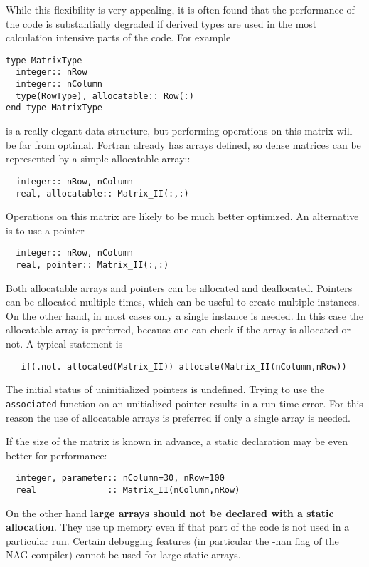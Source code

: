 \documentclass{article}
\begin{document}
While this flexibility is very appealing, it is often found that 
the performance of the code is substantially degraded if derived types
are used in the most calculation intensive parts of the code.
For example
\begin{verbatim}
type MatrixType
  integer:: nRow
  integer:: nColumn
  type(RowType), allocatable:: Row(:)
end type MatrixType
\end{verbatim}
is a really elegant data structure, but performing operations on this
matrix will be far from optimal. Fortran already has arrays defined,
so dense matrices can be represented by a simple allocatable array::
\begin{verbatim}
  integer:: nRow, nColumn
  real, allocatable:: Matrix_II(:,:)
\end{verbatim}
Operations on this matrix are likely to be much better optimized. 
An alternative is to use a pointer
\begin{verbatim}
  integer:: nRow, nColumn
  real, pointer:: Matrix_II(:,:)
\end{verbatim}
Both allocatable arrays and pointers can be allocated and deallocated.
Pointers can be allocated multiple times, which can be useful to create
multiple instances. On the other hand, in most cases only a single
instance is needed. In this case the allocatable array is preferred,
because one can check if the array is allocated or not. A typical
statement is
\begin{verbatim}
   if(.not. allocated(Matrix_II)) allocate(Matrix_II(nColumn,nRow))
\end{verbatim}
The initial status of uninitialized pointers is undefined.
Trying to use the {\tt associated} function on an unitialized pointer
results in a run time error. For this reason the use of allocatable
arrays is preferred if only a single array is needed.

If the size of the matrix is known in advance, a static declaration
may be even better for performance:
\begin{verbatim}
  integer, parameter:: nColumn=30, nRow=100
  real              :: Matrix_II(nColumn,nRow)
\end{verbatim}
On the other hand {\bf large arrays should not be declared with a static 
allocation}. They use up memory even if that part of the code is not
used in a particular run. Certain debugging features (in particular
the -nan flag of the NAG compiler) cannot be used for large static arrays.
\end{document}
